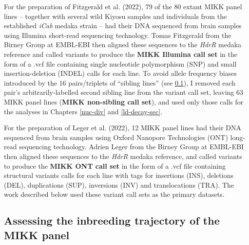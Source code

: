 \documentclass[
]{book}
\begin{document}
For the preparation of Fitzgerald et al. (2022), 79 of the 80 extant MIKK panel lines -- together with several wild Kiyosu samples and individuals from the established \emph{iCab} medaka strain -- had their DNA sequenced from brain samples using Illumina short-read sequencing technology. Tomas Fitzgerald from the Birney Group at EMBL-EBI then aligned these sequences to the \emph{HdrR} medaka reference and called variants to produce the \textbf{MIKK Illumina call set} in the form of a .vcf file containing single nucleotide polymorphism (SNP) and small insertion-deletion (INDEL) calls for each line. To avoid allele frequency biases introduced by the 16 pairs/triplets of ``sibling lines'' (see \ref{inbreeding-sec}), I removed each pair's arbitrarily-labelled second sibling line from the variant call set, leaving 63 MIKK panel lines (\textbf{MIKK non-sibling call set}), and used only those calls for the analyses in Chapters \ref{nuc-div} and \ref{ld-decay-sec}.

For the preparation of Leger et al. (2022), 12 MIKK panel lines had their DNA sequenced from brain samples using Oxford Nanopore Technologies (ONT) long-read sequencing technology. Adrien Leger from the Birney Group at EMBL-EBI then aligned these sequences to the \emph{HdrR} medaka reference, and called variants to produce the \textbf{MIKK ONT call set} in the form of a .vcf file containing structural variants calls for each line with tags for insertions (INS), deletions (DEL), duplications (SUP), inversions (INV) and translocations (TRA). The work described below used these variant call sets as the primary datasets.

\hypertarget{inbreeding-sec}{%
\subsection{Assessing the inbreeding trajectory of the MIKK panel}\label{inbreeding-sec}}
\end{document}
